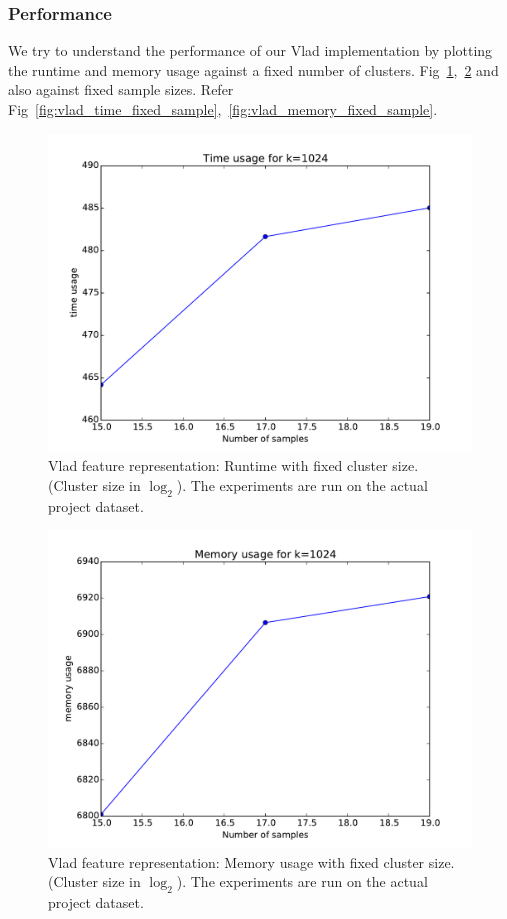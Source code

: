\documentclass[final,leqno,onefignum,onetabnum]{siamltexmm}
\begin{document}
\subsubsection{Performance}
We try to understand the performance of our Vlad implementation by plotting the runtime and memory usage against a fixed number of clusters.  Fig~\ref{fig:vlad_time_fixed_cluster},~\ref{fig:vlad_memory_fixed_cluster} and also against fixed sample sizes. Refer Fig~\ref{fig:vlad_time_fixed_sample},~\ref{fig:vlad_memory_fixed_sample}.
\begin{figure}
  \centering
  \includegraphics[width=0.60\linewidth]{images/vladTimeFixedCluster}
  \caption{Vlad feature representation: Runtime with fixed cluster size. (Cluster size in $\log_{2}$).  The experiments are run on the actual project dataset.\label{fig:vlad_time_fixed_cluster}}
\end{figure}
\begin{figure}
  \centering
  \includegraphics[width=0.60\linewidth]{images/vladMemoryFixedCluster}
  \caption{Vlad feature representation: Memory usage with fixed cluster size. (Cluster size in $\log_{2}$).  The experiments are run on the actual project dataset.\label{fig:vlad_memory_fixed_cluster}}
\end{figure}
\end{document}
